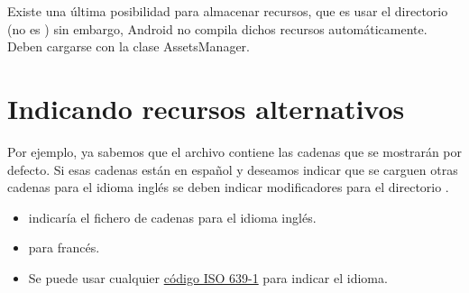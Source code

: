 \documentclass[a4paper,12pt,spanish]{sphinxmanual}
\begin{document}
Existe una última posibilidad para almacenar recursos, que es usar el directorio  (no es ) sin embargo, Android no compila dichos recursos automáticamente. Deben cargarse con la clase AssetsManager.


\section{Indicando recursos alternativos}
\label{tema1:indicando-recursos-alternativos}
Por ejemplo, ya sabemos que el archivo  contiene las cadenas que se mostrarán por defecto. Si esas cadenas están en español y deseamos indicar que se carguen otras cadenas para el idioma inglés se deben indicar modificadores para el directorio .
\begin{itemize}
\item {} 
 indicaría el fichero de cadenas para el idioma inglés.

\item {} 
 para francés.

\item {} 
Se puede usar cualquier \href{http://www.loc.gov/standards/iso639-2/php/code\_list.php}{código ISO 639-1} para indicar el idioma.

\end{itemize}
\end{document}
